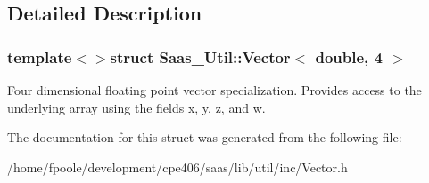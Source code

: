 \subsection{Detailed Description}
\subsubsection*{template$<$$>$struct Saas\+\_\+\+Util\+::\+Vector$<$ double, 4 $>$}

Four dimensional floating point vector specialization. Provides access to the underlying array using the fields x, y, z, and w. 

The documentation for this struct was generated from the following file\+:\begin{DoxyCompactItemize}
\item 
/home/fpoole/development/cpe406/saas/lib/util/inc/Vector.\+h\end{DoxyCompactItemize}
